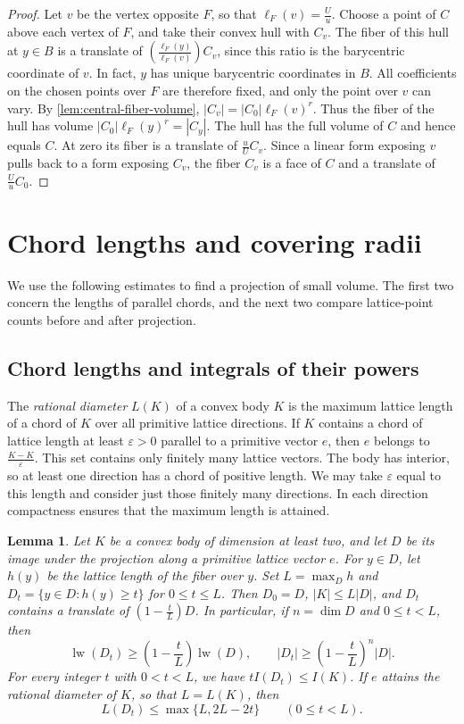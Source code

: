 \documentclass[reqno, 11pt]{article}
\numberwithin{equation}{section}
\newtheorem{lemma}[lemma]{Lemma}
\theoremstyle{definition}
\begin{document}
\begin{proof}
Let $v$ be the vertex opposite $F$, so that $\ell_F(v)=\frac{U}{u}$.
Choose a point of $C$ above each vertex of $F$, and take their convex
hull with $C_v$. The fiber of this hull at $y\in B$ is a translate
of $(\frac{\ell_F(y)}{\ell_F(v)})C_v$, since this ratio is the barycentric
coordinate of $v$. In fact, $y$ has unique barycentric coordinates
in $B$. All coefficients on the chosen points over $F$ are
therefore fixed, and only the point over $v$ can vary. By \cref{lem:central-fiber-volume},
$|C_v|=|C_0|\ell_F(v)^r$. Thus the fiber of the hull has volume
$|C_0|\ell_F(y)^r=|C_y|$. The hull has the full volume of $C$ and hence
equals $C$. At zero its fiber is a translate of $\frac{u}{U}C_v$. Since a linear form exposing $v$ pulls back
to a form exposing $C_v$, the fiber $C_v$ is a face of $C$ and a
translate of $\frac{U}{u}C_0$.
\end{proof}

\section{Chord lengths and covering radii}\label{sec:tools}

We use the following estimates to find a projection of small volume.
The first two concern the lengths of parallel chords, and the next
two compare lattice-point counts before and after projection.

\subsection{Chord lengths and integrals of their powers}

The \emph{rational diameter} $L(K)$ of a convex body $K$ is the
maximum lattice length of a chord of $K$ over all primitive lattice
directions. If $K$ contains a chord of lattice length at least
$\varepsilon>0$ parallel to a primitive vector $e$, then $e$ belongs to
$\frac{K-K}{\varepsilon}$. This set contains only finitely many lattice
vectors. The body has interior, so at least one direction has a
chord of positive length. We may take $\varepsilon$ equal to this
length and consider just those finitely many directions. In each
direction compactness ensures that the maximum length is attained.

\begin{lemma}\label{aux:chords}
Let $K$ be a convex body of dimension at least two, and let $D$ be
its image under the projection along a primitive lattice vector $e$.
For $y\in D$, let $h(y)$ be the lattice length of the fiber over $y$.
Set $L=\max_D h$ and $D_t=\{y\in D:h(y)\ge t\}$ for $0\le t\le L$.
Then $D_0=D$, $|K|\le L|D|$, and $D_t$ contains a translate of
$(1-\frac{t}{L})D$. In particular, if $n=\dim D$ and $0\le t<L$, then
\[
  \operatorname{lw}(D_t)\ge(1-\frac{t}{L})\operatorname{lw}(D),\qquad
  |D_t|\ge(1-\frac{t}{L})^n|D|.
\]
For every integer $t$ with $0<t<L$, we have $tI(D_t)\le I(K)$.
If $e$ attains the rational diameter of $K$, so that $L=L(K)$, then
\begin{equation}\label{aux:nested}
                   L(D_t)\le\max\{L,2L-2t\}\qquad(0\le t<L).
\end{equation}
\end{lemma}
\end{document}
